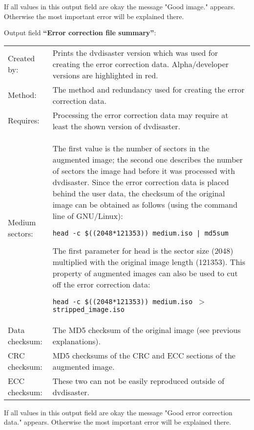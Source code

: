 If all values in this output field are okay the 
message "\textcolor{dkgreen}{Good image.}" appears. 
Otherwise the most important error will be explained there. 
\newpage

Output field {\bf ``Error correction file summary''}:

\medskip

\begin{tabular}{lp{125mm}}
Created by: &
Prints the dvdisaster version which was used for creating the error 
correction data. Alpha/developer versions are highlighted in red. \\
Method: &
The method and redundancy used for creating the error correction data. \\
Requires: &
Processing the error correction data may require at least the shown version of dvdisaster. \\
Medium sectors: &
The first value is the number of sectors in the augmented image; 
the second one describes the number of sectors the image had before 
it was processed with dvdisaster. Since the error correction data is 
placed behind the user data, the checksum of the original image can be 
obtained as follows (using the command line of GNU/Linux):

\smallskip

{\tt head -c \$((2048*121353)) medium.iso | md5sum}

\smallskip

The first parameter for head is the sector size (2048) multiplied 
with the original image length (121353). This property of augmented images 
can also be used to cut off the error correction data:

\smallskip

{\tt head -c \$((2048*121353)) medium.iso $>$stripped\_image.iso}\\
Data checksum: &
The MD5 checksum of the original image (see previous explanations). \\
CRC checksum: & MD5 checksums of the CRC and ECC sections of the augmented image. \\
ECC checksum: & These two can not be easily reproduced outside of dvdisaster. \\
\end{tabular}

\bigskip

If all values in this output field are okay the
message "\textcolor{dkgreen}{Good error correction data.}" appears.
Otherwise the most important error will be explained there.

